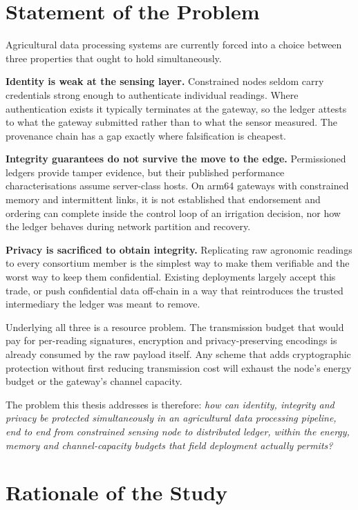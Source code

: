 \documentclass[12pt,a4paper,oneside]{book}
\begin{document}
\section{Statement of the Problem}
\label{sec:problem}

Agricultural data processing systems are currently forced into a choice between
three properties that ought to hold simultaneously.

\textbf{Identity is weak at the sensing layer.} Constrained nodes seldom carry
credentials strong enough to authenticate individual readings. Where
authentication exists it typically terminates at the gateway, so the ledger
attests to what the gateway submitted rather than to what the sensor measured.
The provenance chain has a gap exactly where falsification is cheapest.

\textbf{Integrity guarantees do not survive the move to the edge.} Permissioned
ledgers provide tamper evidence, but their published performance
characterisations assume server-class hosts. On \gls{arm64} gateways with
constrained memory and intermittent links, it is not established that
endorsement and ordering can complete inside the control loop of an irrigation
decision, nor how the ledger behaves during network partition and recovery.

\textbf{Privacy is sacrificed to obtain integrity.} Replicating raw agronomic
readings to every consortium member is the simplest way to make them verifiable
and the worst way to keep them confidential. Existing deployments largely accept
this trade, or push confidential data off-chain in a way that reintroduces the
trusted intermediary the ledger was meant to remove.

Underlying all three is a resource problem. The transmission budget that would
pay for per-reading signatures, encryption and privacy-preserving encodings is
already consumed by the raw payload itself. Any scheme that adds cryptographic
protection without first reducing transmission cost will exhaust the node's
energy budget or the gateway's channel capacity.

The problem this thesis addresses is therefore: \emph{how can identity,
integrity and privacy be protected simultaneously in an agricultural data
processing pipeline, end to end from constrained sensing node to distributed
ledger, within the energy, memory and channel-capacity budgets that field
deployment actually permits?}

\section{Rationale of the Study}
\label{sec:rationale}
\end{document}
